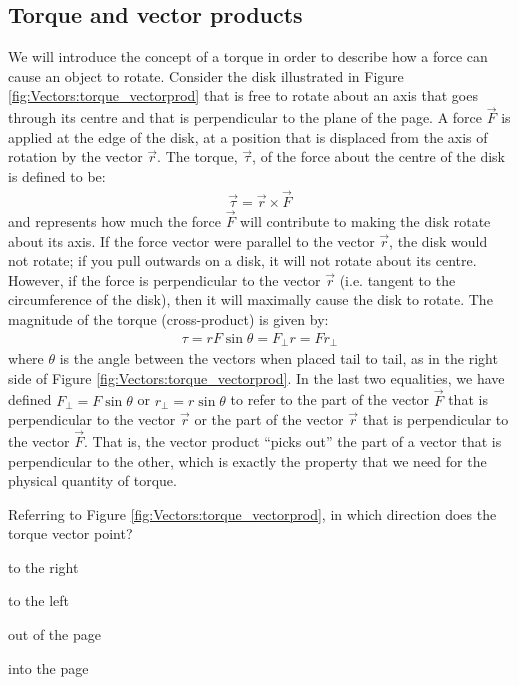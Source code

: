 \subsection{Torque and vector products}
We will introduce the concept of a torque in order to describe how a force can cause an object to rotate. Consider the disk illustrated in Figure \ref{fig:Vectors:torque_vectorprod} that is free to rotate about an axis that goes through its centre and that is perpendicular to the plane of the page. A force $\vec F$ is applied at the edge of the disk, at a position that is displaced from the axis of rotation by the vector $\vec r$. The torque, $\vec \tau$, of the force about the centre of the disk is defined to be:
\begin{align*}
\vec\tau=\vec r\times \vec F
\end{align*}
and represents how much the force $\vec F$ will contribute to making the disk rotate about its axis. If the force vector were parallel to the vector $\vec r$, the disk would not rotate; if you pull outwards on a disk, it will not rotate about its centre. However, if the force is perpendicular to the vector $\vec r$ (i.e. tangent to the circumference of the disk), then it will maximally cause the disk to rotate. The magnitude of the torque (cross-product) is given by:
\begin{align*}
\tau =rF\sin\theta=F_{\perp}r=Fr_\perp
\end{align*}
where $\theta$ is the angle between the vectors when placed tail to tail, as in the right side of Figure \ref{fig:Vectors:torque_vectorprod}. In the last two equalities, we have defined $F_\perp=F\sin\theta$ or $r_\perp=r\sin\theta$ to refer to the part of the vector $\vec F$ that is perpendicular to the vector $\vec r$ or the part of the vector $\vec r$ that is perpendicular to the vector $\vec F$. That is, the vector product ``picks out'' the part of a vector that is perpendicular to the other, which is exactly the property that we need for the physical quantity of torque.


\begin{checkpoint}
\begin{MCquestion}{Referring to Figure \ref{fig:Vectors:torque_vectorprod}, in which direction does the torque vector point?}
\item to the right
\item to the left
\item out of the page 
\item into the page \correct
\end{MCquestion}
\end{checkpoint}